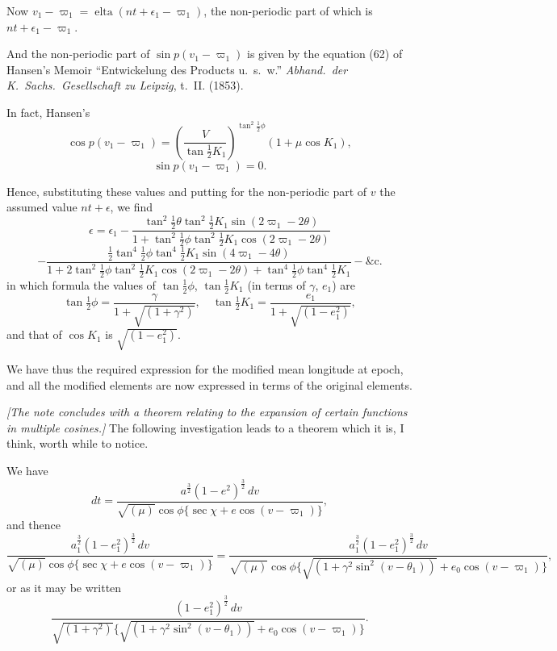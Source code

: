 \documentclass[11pt,a4paper]{book}
\begin{document}
Now $v_1 - \varpi_1 = \operatorname{elta}(nt + \epsilon_1 - \varpi_1)$, the non-periodic part of which is $nt + \epsilon_1 - \varpi_1$.

And the non-periodic part of $\sin p(v_1 - \varpi_1)$ is given by the equation (62) of Hansen's Memoir ``Entwickelung des Products u.~s.~w.'' \textit{Abhand.\ der K.\ Sachs.\ Gesellschaft zu Leipzig}, t.~II. (1853).

In fact, Hansen's
\[
\cos p(v_1 - \varpi_1) = \left(\frac{V}{\tan \tfrac{1}{2}K_1}\right)^{\tan^2 \tfrac{1}{2}\phi} (1 + \mu \cos K_1),
\]
\[
\sin p(v_1 - \varpi_1) = 0.
\]

Hence, substituting these values and putting for the non-periodic part of $v$ the assumed value $nt + \epsilon$, we find
\[
\epsilon = \epsilon_1 - \frac{\tan^2 \tfrac{1}{2}\theta \tan^2 \tfrac{1}{2}K_1 \sin(2\varpi_1 - 2\theta)}{1 + \tan^2 \tfrac{1}{2}\phi \tan^2 \tfrac{1}{2}K_1 \cos(2\varpi_1 - 2\theta)}
\]
\[
- \frac{\frac{1}{2}\tan^4 \tfrac{1}{2}\phi \tan^4 \tfrac{1}{2}K_1 \sin(4\varpi_1 - 4\theta)}{1 + 2\tan^2 \tfrac{1}{2}\phi \tan^2 \tfrac{1}{2}K_1 \cos(2\varpi_1 - 2\theta) + \tan^4 \tfrac{1}{2}\phi \tan^4 \tfrac{1}{2}K_1} - \&\text{c.}
\]
in which formula the values of $\tan \tfrac{1}{2}\phi$, $\tan \tfrac{1}{2}K_1$ (in terms of $\gamma$, $e_1$) are
\[
\tan \tfrac{1}{2}\phi = \frac{\gamma}{1 + \sqrt{(1 + \gamma^2)}}, \quad \tan \tfrac{1}{2}K_1 = \frac{e_1}{1 + \sqrt{(1 - e_1^2)}},
\]
and that of $\cos K_1$ is $\sqrt{(1 - e_1^2)}$.

We have thus the required expression for the modified mean longitude at epoch, and all the modified elements are now expressed in terms of the original elements.

\textit{[The note concludes with a theorem relating to the expansion of certain functions in multiple cosines.]} The following investigation leads to a theorem which it is, I think, worth while to notice.

We have
\[
dt = \frac{a^{\frac{3}{2}}(1 - e^2)^{\frac{3}{2}} \, dv}{\sqrt{(\mu)} \cos \phi \{\sec \chi + e \cos(v - \varpi_1)\}},
\]
and thence
\[
\frac{a_1^{\frac{3}{2}}(1 - e_1^2)^{\frac{3}{2}} \, dv}{\sqrt{(\mu)} \cos \phi \{\sec \chi + e \cos(v - \varpi_1)\}} = \frac{a_1^{\frac{3}{2}}(1 - e_1^2)^{\frac{3}{2}} \, dv}{\sqrt{(\mu)} \cos \phi \{\sqrt{(1 + \gamma^2 \sin^2(v - \theta_1))} + e_0 \cos(v - \varpi_1)\}},
\]
or as it may be written
\[
\frac{(1 - e_1^2)^{\frac{3}{2}} \, dv}{\sqrt{(1 + \gamma^2)} \{\sqrt{(1 + \gamma^2 \sin^2(v - \theta_1))} + e_0 \cos(v - \varpi_1)\}}.
\]
\end{document}
